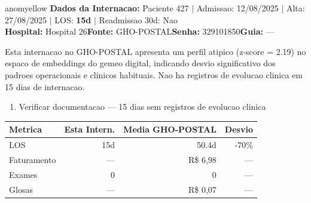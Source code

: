 \documentclass[a4paper,10pt]{article}
\begin{document}
\begin{anomalycard}[Internacao 28 | GHO-POSTAL | MODERADO (z=2.19)]{anomyellow}
\textbf{Dados da Internacao:} Paciente 427 $\mid$ Admissao: 12/08/2025 $\mid$ Alta: 27/08/2025 $\mid$ LOS: \textbf{15d} $\mid$ Readmissao 30d: Nao\\
\textbf{Hospital:} Hospital 26\quad\textbf{Fonte:} GHO-POSTAL\quad\textbf{Senha:} 329101850\quad\textbf{Guia:} ---\\
\vspace{2pt}\begin{tcolorbox}[colback=severityred!20,colframe=anomyellow,title={\textbf{Interpretacao de Negocio}},fonttitle=\bfseries\small,left=4pt,right=4pt,top=3pt,bottom=3pt]
{\small Esta internacao no GHO-POSTAL apresenta um perfil atipico (z-score = 2.19) no espaco de embeddings do gemeo digital, indicando desvio significativo dos padroes operacionais e clinicos habituais. Nao ha registros de evolucao clinica em 15 dias de internacao.}
\end{tcolorbox}
\begin{tcolorbox}[colback=severityyellow!30,colframe=anomorange,title={\textbf{Recomendacoes Especificas}},fonttitle=\bfseries\small,left=4pt,right=4pt,top=3pt,bottom=3pt]
\begin{enumerate}[nosep,leftmargin=16pt]
\item {\small Verificar documentacao --- 15 dias sem registros de evolucao clinica}
\end{enumerate}
\end{tcolorbox}
\begin{center}\begin{tabular}{l r r r}\toprule\textbf{Metrica} & \textbf{Esta Intern.} & \textbf{Media GHO-POSTAL} & \textbf{Desvio} \\\midrule
LOS & 15d & 50.4d & -70\% \\
Faturamento & --- & R\$ 6,98 & --- \\
Exames & 0 & 0 & --- \\
Glosas & --- & R\$ 0,07 & --- \\
\bottomrule\end{tabular}\end{center}


\end{anomalycard}
\end{document}
